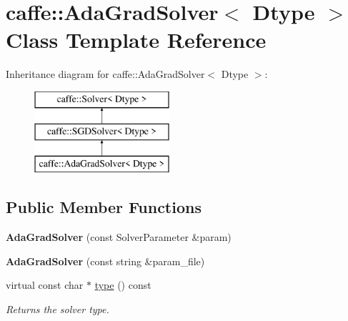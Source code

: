 \hypertarget{classcaffe_1_1AdaGradSolver}{}\section{caffe\+:\+:Ada\+Grad\+Solver$<$ Dtype $>$ Class Template Reference}
\label{classcaffe_1_1AdaGradSolver}
Inheritance diagram for caffe\+:\+:Ada\+Grad\+Solver$<$ Dtype $>$\+:\begin{figure}[H]
\begin{center}
\leavevmode
\includegraphics[height=3.000000cm]{classcaffe_1_1AdaGradSolver}
\end{center}
\end{figure}
\subsection*{Public Member Functions}
\begin{DoxyCompactItemize}
\item 
{\bfseries Ada\+Grad\+Solver} (const Solver\+Parameter \&param)\hypertarget{classcaffe_1_1AdaGradSolver_acfa678395af17eb9cfcf21e8b9fe5ce9}{}\label{classcaffe_1_1AdaGradSolver_acfa678395af17eb9cfcf21e8b9fe5ce9}

\item 
{\bfseries Ada\+Grad\+Solver} (const string \&param\+\_\+file)\hypertarget{classcaffe_1_1AdaGradSolver_aca70c4ae0d471a6a2610d371e95f5ffa}{}\label{classcaffe_1_1AdaGradSolver_aca70c4ae0d471a6a2610d371e95f5ffa}

\item 
virtual const char $\ast$ \hyperlink{classcaffe_1_1AdaGradSolver_a84a25e1e80e8aaca9df573f93a18da21}{type} () const \hypertarget{classcaffe_1_1AdaGradSolver_a84a25e1e80e8aaca9df573f93a18da21}{}\label{classcaffe_1_1AdaGradSolver_a84a25e1e80e8aaca9df573f93a18da21}

\begin{DoxyCompactList}\small\item\em Returns the solver type. \end{DoxyCompactList}\end{DoxyCompactItemize}
